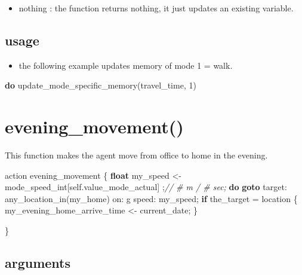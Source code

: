 \documentclass[]{book}
\newenvironment{Shaded}{\begin{snugshade}}{\end{snugshade}}
\newcommand{\CommentTok}[1]{\textcolor[rgb]{0.56,0.35,0.01}{\textit{#1}}}
\newcommand{\DecValTok}[1]{\textcolor[rgb]{0.00,0.00,0.81}{#1}}
\newcommand{\KeywordTok}[1]{\textcolor[rgb]{0.13,0.29,0.53}{\textbf{#1}}}
\newcommand{\NormalTok}[1]{#1}
\newcommand{\OtherTok}[1]{\textcolor[rgb]{0.56,0.35,0.01}{#1}}
\providecommand{\tightlist}{%
  \setlength{\itemsep}{0pt}\setlength{\parskip}{0pt}}
\theoremstyle{definition}
\theoremstyle{definition}
\theoremstyle{definition}
\theoremstyle{remark}
\begin{document}
\begin{itemize}
\tightlist
\item
  nothing : the function returns nothing, it just updates an existing
  variable.
\end{itemize}

\hypertarget{usage}{%
\subsection*{usage}\label{usage}}

\begin{itemize}
\tightlist
\item
  the following example updates memory of mode 1 = walk.
\end{itemize}

\begin{Shaded}
\begin{Highlighting}[]
\KeywordTok{do}\NormalTok{ update_mode_specific_memory}\OtherTok{(}\NormalTok{travel_time}\OtherTok{,} \DecValTok{1}\OtherTok{)}
\end{Highlighting}
\end{Shaded}

\hypertarget{evening_movement}{%
\section{evening\_movement()}\label{evening_movement}}

This function makes the agent move from office to home in the evening.

\begin{Shaded}
\begin{Highlighting}[]
\NormalTok{action evening_movement}
\NormalTok{    \{}
        \KeywordTok{float}\NormalTok{ my_speed <- mode_speed_int}\OtherTok{[}\NormalTok{self.value_mode_actual}\OtherTok{]} \OtherTok{;}\CommentTok{// # m / # sec;}
        \KeywordTok{do} \KeywordTok{goto}\NormalTok{ target: any_location_in}\OtherTok{(}\NormalTok{my_home}\OtherTok{)}\NormalTok{ on: g speed: my_speed}\OtherTok{;}
        \KeywordTok{if}\NormalTok{ the_target = location}
\NormalTok{        \{}
\NormalTok{            my_evening_home_arrive_time <- current_date}\OtherTok{;}
\NormalTok{        \}}

\NormalTok{    \}}
\end{Highlighting}
\end{Shaded}

\hypertarget{arguments-1}{%
\subsection*{arguments}\label{arguments-1}}
\end{document}

